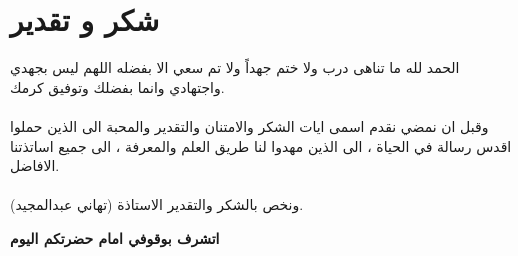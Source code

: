 \chapter*{شكر و تقدير}

الحمد لله ما تناهى درب ولا ختم جهداً ولا تم سعي الا بفضله اللهم ليس بجهدي واجتهادي وانما بفضلك وتوفيق كرمك.\\ \\
\noindent
وقبل ان نمضي نقدم اسمى ايات الشكر والامتنان والتقدير والمحبة الى الذين حملوا اقدس رسالة في الحياة ، الى الذين مهدوا لنا طريق العلم والمعرفة ، الى جميع اساتذتنا الافاضل. \\ \\
\noindent
ونخص بالشكر والتقدير الاستاذة (تهاني عبدالمجيد).\\
\begin{center}
	\textbf{اتشرف بوقوفي امام حضرتكم اليوم}
\end{center}